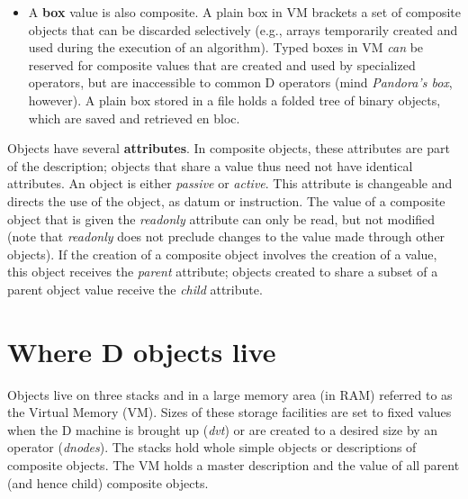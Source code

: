 \begin{itemize}
\item A \textbf{box} value is also composite. A plain box in VM brackets a set of composite objects that can be discarded selectively (e.g., arrays temporarily created and used during the execution of an algorithm). Typed boxes in VM \emph{can} be reserved for composite values that are created and used by specialized operators, but are inaccessible to common D operators (mind \emph{Pandora's box}, however). A plain box stored in a file holds a folded tree of binary objects, which are saved and retrieved en bloc.
\end{itemize}

Objects  have several \textbf{attributes}.  In composite objects,  these  attributes  are part  of the description;  objects that share a value thus need not  have identical  attributes.  An  object  is either  \emph{passive} or  \emph{active}.  This attribute  is changeable and directs the use of the object,  as datum  or instruction. The value of a composite object that is given the \emph{readonly} attribute can only be read,  but not modified (note that \emph{readonly} does  not preclude  changes  to the value made through  other  objects). If the creation of a composite object involves the creation of a value,  this  object receives the \emph{parent} attribute;  objects  created  to share  a subset of a parent object value receive the \emph{child} attribute. 

\section{Where D objects live}

Objects  live  on  three stacks and in  a  large  memory  area (in RAM) referred to as the Virtual Memory (VM). Sizes of these storage facilities are set to fixed values when the D machine is brought up (\emph{dvt}) or are created to a desired size by an operator (\emph{dnodes}).  The stacks  hold  whole simple  objects  or descriptions of composite objects.  The  VM  holds  a master  description  and  the  value of  all  parent (and hence child) composite objects.

